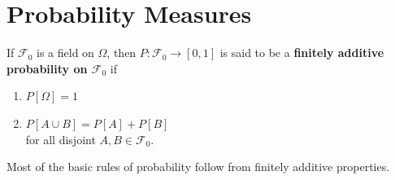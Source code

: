 %
%

%
%



\clearpage
\section{Probability Measures}


\begin{definition}
If $\mathcal F_0$ is a field on $\Omega$, then $P:\mathcal F_0\rightarrow [0,1]$ is said to be a {\bf finitely additive probability on $\mathcal F_0$} if
\begin{enumerate}
\item $P[\Omega]=1$
\item $P[A\cup B]=P[A]+P[B]$ \\ for all disjoint $A, B\in\mathcal F_0$.
\end{enumerate}
\end{definition}

Most of the basic rules of probability follow from  finitely additive properties.

